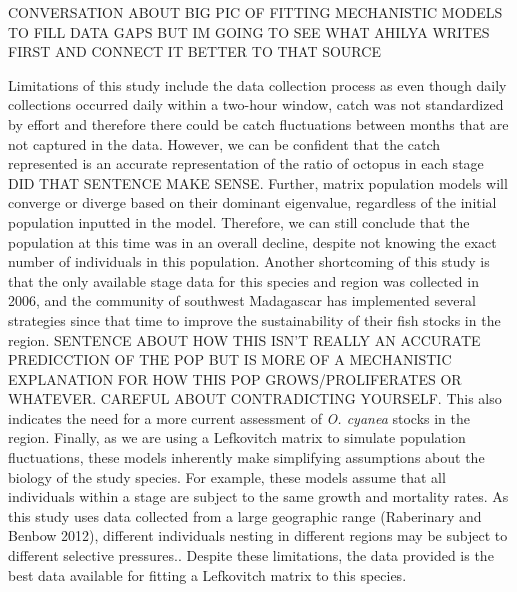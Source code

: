 \documentclass[
]{article}
\begin{document}
CONVERSATION ABOUT BIG PIC OF FITTING MECHANISTIC MODELS TO FILL DATA GAPS BUT IM GOING TO SEE WHAT AHILYA WRITES FIRST AND CONNECT IT BETTER TO THAT SOURCE

Limitations of this study include the data collection process as even though daily collections occurred daily within a two-hour window, catch was not standardized by effort and therefore there could be catch fluctuations between months that are not captured in the data. However, we can be confident that the catch represented is an accurate representation of the ratio of octopus in each stage DID THAT SENTENCE MAKE SENSE. Further, matrix population models will converge or diverge based on their dominant eigenvalue, regardless of the initial population inputted in the model. Therefore, we can still conclude that the population at this time was in an overall decline, despite not knowing the exact number of individuals in this population. Another shortcoming of this study is that the only available stage data for this species and region was collected in 2006, and the community of southwest Madagascar has implemented several strategies since that time to improve the sustainability of their fish stocks in the region. SENTENCE ABOUT HOW THIS ISN'T REALLY AN ACCURATE PREDICCTION OF THE POP BUT IS MORE OF A MECHANISTIC EXPLANATION FOR HOW THIS POP GROWS/PROLIFERATES OR WHATEVER. CAREFUL ABOUT CONTRADICTING YOURSELF. This also indicates the need for a more current assessment of \emph{O. cyanea} stocks in the region. Finally, as we are using a Lefkovitch matrix to simulate population fluctuations, these models inherently make simplifying assumptions about the biology of the study species. For example, these models assume that all individuals within a stage are subject to the same growth and mortality rates. As this study uses data collected from a large geographic range (Raberinary and Benbow 2012), different individuals nesting in different regions may be subject to different selective pressures.. Despite these limitations, the data provided is the best data available for fitting a Lefkovitch matrix to this species.
\end{document}
